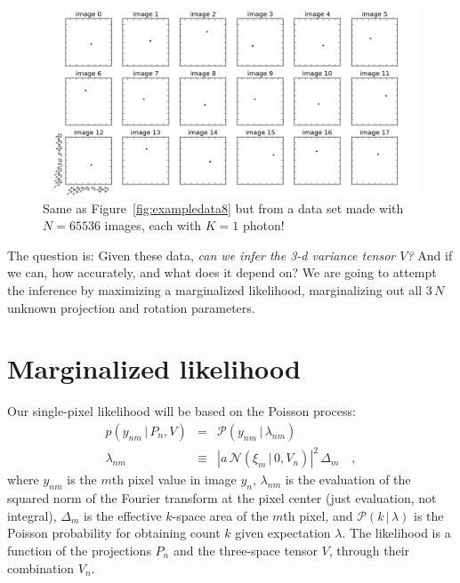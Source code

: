 \documentclass[12pt]{article}
\newcommand{\hoggcaption}[1]{\caption{\textsf{#1}}}
\renewcommand{\figurename}{\textsf{Figure}}
\newcommand{\normal}{\mathscr{N}}
\newcommand{\Poisson}{\mathscr{P}}
\newcommand{\sqnorm}[1]{|{#1}|^2}
\newcommand{\given}{\,|\,}
\begin{document}
\begin{figure}[!tbp]
\includegraphics[width=\textwidth]{data_16_00.png}
\hoggcaption{Same as \figurename~\ref{fig:exampledata8} but from a data set made with
  $N=65536$ images, each with $K=1$ photon!\label{fig:exampledata0}}
\end{figure}

The question is:
Given these data, \emph{can we infer the 3-d variance tensor $V$?}
And if we can, how accurately, and what does it depend on?  We are
going to attempt the inference by maximizing a marginalized
likelihood, marginalizing out all $3\,N$ unknown projection and
rotation parameters.

\section{Marginalized likelihood}

Our single-pixel likelihood will be based on the Poisson process:
\begin{eqnarray}
  p(y_{nm}\given P_n,V) &=& \Poisson(y_{nm}\given\lambda_{nm})
  \\
  \lambda_{nm} &\equiv& \sqnorm{a\,\normal(\xi_m\given 0,V_n)}\,\Delta_m
  \quad,
\end{eqnarray}
where $y_{nm}$ is the $m$th pixel value in image $y_n$,
$\lambda_{nm}$ is the evaluation of the squared norm of the Fourier
transform at the pixel center (just evaluation, not integral),
$\Delta_m$ is the effective $k$-space area of the $m$th pixel,
and $\Poisson(k\given\lambda)$ is the Poisson probability for obtaining
count $k$ given expectation $\lambda$.
The likelihood is a function of the projections $P_n$ and the
three-space tensor $V$, through their combination $V_n$.
\end{document}
